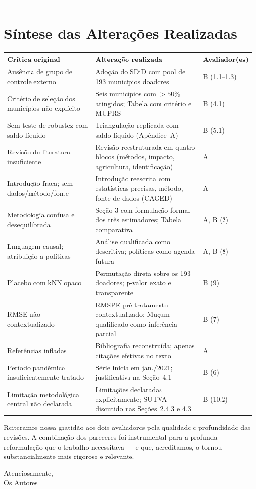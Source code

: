 \documentclass[a4paper,12pt]{article}
\begin{document}
\bigskip
\hrule
\bigskip

\section*{Síntese das Alterações Realizadas}

\begin{table}[h!]
\centering
\small
\begin{tabular}{p{5.5cm} p{4.5cm} p{4cm}}
\toprule
\textbf{Crítica original} & \textbf{Alteração realizada} & \textbf{Avaliador(es)} \\
\midrule
Ausência de grupo de controle externo &
Adoção do SDiD com pool de 193 municípios doadores &
B (1.1--1.3) \\[4pt]
Critério de seleção dos municípios não explícito &
Seis municípios com $>50\%$ atingidos; Tabela com critério e MUPRS &
B (4.1) \\[4pt]
Sem teste de robustez com saldo líquido &
Triangulação replicada com saldo líquido (Apêndice~A) &
B (5.1) \\[4pt]
Revisão de literatura insuficiente &
Revisão reestruturada em quatro blocos (métodos, impacto, agricultura, identificação) &
A \\[4pt]
Introdução fraca; sem dados/método/fonte &
Introdução reescrita com estatísticas precisas, método, fonte de dados (CAGED) &
A \\[4pt]
Metodologia confusa e desequilibrada &
Seção 3 com formulação formal dos três estimadores; Tabela comparativa &
A, B (2) \\[4pt]
Linguagem causal; atribuição a políticas &
Análise qualificada como descritiva; políticas como agenda futura &
A, B (8) \\[4pt]
Placebo com kNN opaco &
Permutação direta sobre os 193 doadores; p-valor exato e transparente &
B (9) \\[4pt]
RMSE não contextualizado &
RMSPE pré-tratamento contextualizado; Muçum qualificado como inferência parcial &
B (7) \\[4pt]
Referências infladas &
Bibliografia reconstruída; apenas citações efetivas no texto &
A \\[4pt]
Período pandêmico insuficientemente tratado &
Série inicia em jan./2021; justificativa na Seção~4.1 &
B (6) \\[4pt]
Limitação metodológica central não declarada &
Limitações declaradas explicitamente; SUTVA discutido nas Seções~2.4.3 e 4.3 &
B (10.2) \\
\bottomrule
\end{tabular}
\end{table}

\bigskip

Reiteramos nossa gratidão aos dois avaliadores pela qualidade e profundidade das
revisões. A combinação dos pareceres foi instrumental para a profunda reformulação que
o trabalho necessitava — e que, acreditamos, o tornou substancialmente mais rigoroso
e relevante.

\bigskip\bigskip

\noindent Atenciosamente,\\[0.3em]
\noindent Os Autores
\end{document}
